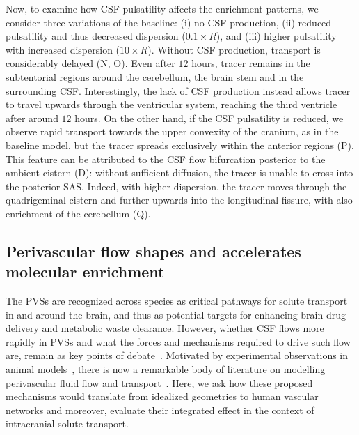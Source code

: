 \documentclass[fleqn,10pt]{wlscirep}
\begin{document}
Now, to examine how CSF pulsatility affects the enrichment patterns,
we consider three variations of the baseline: (i) no CSF production,
(ii) reduced pulsatility and thus decreased dispersion ($0.1 \times
R$), and (iii) higher pulsatility with increased dispersion ($10
\times R$). Without CSF production, transport is considerably delayed
(N, O). Even after $12$ hours, tracer remains in the
subtentorial regions around the cerebellum, the brain stem and in the
surrounding CSF. Interestingly, the lack of CSF production instead
allows tracer to travel upwards through the ventricular system,
reaching the third ventricle after around $12$ hours. On the other
hand, if the CSF pulsatility is reduced, we observe rapid transport
towards the upper convexity of the cranium, as in the baseline model,
but the tracer spreads exclusively within the anterior regions
(P). This feature can be attributed to the CSF flow
bifurcation posterior to the ambient cistern (D):
without sufficient diffusion, the tracer is unable to cross into the
posterior SAS. Indeed, with higher dispersion, the tracer moves
through the quadrigeminal cistern and further upwards into the
longitudinal fissure, with also enrichment of the cerebellum
(Q).

\subsection*{Perivascular flow shapes and accelerates molecular enrichment}
\label{sec:pvs_flow_results}

The PVSs are recognized across species as critical pathways for solute
transport in and around the brain, and thus as potential targets for
enhancing brain drug delivery and metabolic waste clearance. However,
whether CSF flows more rapidly in PVSs and what the forces and
mechanisms required to drive such flow are, remain as key points of
debate~\cite{bohr2022glymphatic, van2024caa}. Motivated by
experimental observations in animal
models~\cite{iliff2012paravascular, iliff2013cerebral, mestre2018flow,
  bedussi2018paravascular}, there is now a remarkable body of
literature on modelling perivascular fluid flow and
transport~\cite{bilston2003arterial, asgari2016glymphatic,
  rey2018pulsatile, daversin2020mechanisms, sharp2019dispersion,
  thomas2019fluid, kedarasetti2020functional, kedarasetti2020arterial,
  troyetsky2021dispersion, martinac2021phase, gjerde2023directional,
  nozaleda2024arterial}. Here, we ask how these proposed mechanisms
would translate from idealized geometries to human vascular networks
and moreover, evaluate their integrated effect in the context of
intracranial solute transport.
\end{document}
